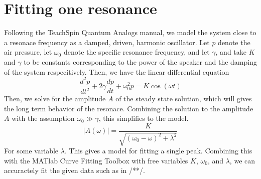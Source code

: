 \documentclass[12]{amsart}
\newcommand{\deriv}[2]{\frac{d#1}{d#2}}
\newcommand{\dderiv}[2]{\frac{d^2#1}{d#2^2}}
\newcommand{\abs}[1]{\vert#1\vert}
\begin{document}
    \section{Fitting one resonance}
    Following the TeachSpin Quantum Analogs manual, we model the system close to a resonace frequency as a damped, driven, harmonic oscillator. Let $p$ denote the air pressure, let $\omega_0$ denote the specific resonance frequency, and let $\gamma$, and take $K$ and $\gamma$ to be constants corresponding to the power of the speaker and the damping of the system respecitively. Then, we have the linear differential equation
    \begin{equation*}
        \dderiv{p}{t} + 2\gamma\deriv{p}{t} + \omega_0^2p = K\cos(\omega t)
    \end{equation*}
    Then, we solve for the amplitude $A$ of the steady state solution, which will gives the long term behavior of the resonace. Combining the solution to the amplitude $A$ with the assumption $\omega_0 \gg \gamma$, this simplifies to the model.
    \begin{equation*}
        \abs{A(\omega)} = \frac{K}{\sqrt{(\omega_0-\omega)^2+\lambda^2}}
    \end{equation*}
For some variable $\lambda$. This gives a model for fitting a single peak. Combining this with the MATlab Curve Fitting Toolbox with free variables $K$, $\omega_0$, and $\lambda$, we can accuractely fit the given data such as in /**/.
    
    
\end{document}
